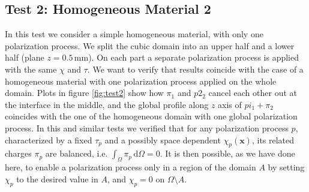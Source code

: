 \documentclass[11pt,a4paper]{article}
\begin{document}
\subsection{Test 2: Homogeneous Material 2}
In this test we consider a simple homogeneous material, with only one polarization process. We split the cubic domain into an upper half and a lower half (plane \(z=0.5\,\)mm). On each part a separate polarization process is applied with the same \(\chi\) and \(\tau\). We want to verify that results coincide with the case of a homogeneous material with one polarization process applied on the whole domain. Plots in figure \ref{fig:test2} show how \(\pi_1\) and \(p2_2\) cancel each other out at the interface in the middle, and the global profile along \(z\) axis of \(pi_1+\pi_2\) coincides with the one of the homogeneous domain with one global polarization process. In this and similar tests we verified that for any polarization process \(p\), characterized by a fixed \(\tau_p\) and a possibly space dependent \(\chi_p(\mathbf{x})\), its related charges \(\pi_p\) are balanced, i.e. \(\int_{\Omega}\pi_p\,\mathrm{d}\Omega=0\). It is then possible, as we have done here, to enable a polarization process only in a region of the domain \(A\) by setting \(\chi_p\) to the desired value in \(A\), and \(\chi_p = 0\) on \(\Omega\setminus A\).
\end{document}
